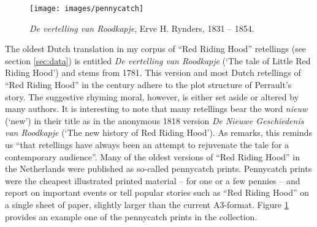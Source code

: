 \begin{figure}
\centering
\texttt{[image: images/pennycatch]}
\caption{\emph{De vertelling van Roodkapje}, Erve H. Rynders, 1831 -- 1854.}
\label{fig:pennycatch}
\end{figure}

The oldest Dutch translation in my corpus of ``Red Riding Hood'' retellings (see section \ref{sec:data}) is entitled \emph{De vertelling van Roodkapje} (`The tale of Little Red Riding Hood') and stems from 1781. This version and most Dutch retellings of ``Red Riding Hood'' in the  century adhere to the plot structure of Perrault's story. The suggestive rhyming moral, however, is either set aside or altered by many authors. It is interesting to note that many retellings bear the word \emph{nieuw} (`new') in their title as in the anonymous 1818 version \emph{De Nieuwe Geschiedenis van Roodkapje} (`The new history of Red Riding Hood'). As \citeauthor{beckett:2002} remarks, this reminds us ``that retellings have always been an attempt to rejuvenate the tale for a contemporary audience''\autocite[xvi]{beckett:2002}. Many of the oldest versions of ``Red Riding Hood'' in the Netherlands were published as so-called pennycatch prints. Pennycatch prints were the cheapest illustrated printed material -- for one or a few pennies -- and report on important events or tell popular stories such as ``Red Riding Hood'' on a single sheet of paper, slightly larger than the current A3-format. Figure \ref{fig:pennycatch} provides an example one of the pennycatch prints in the collection. 

